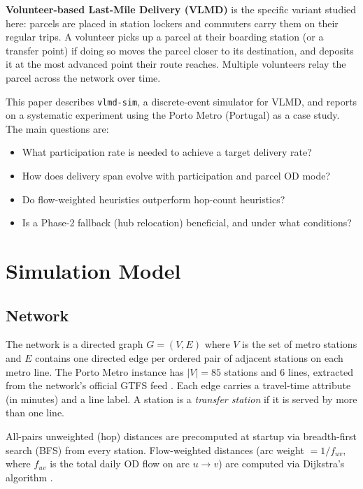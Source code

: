 \documentclass[11pt,a4paper]{article}
\begin{document}
\textbf{Volunteer-based Last-Mile Delivery (VLMD)} is the specific variant
studied here: parcels are placed in station lockers and commuters carry them
on their regular trips. A volunteer picks up a parcel at their boarding
station (or a transfer point) if doing so moves the parcel closer to its
destination, and deposits it at the most advanced point their route reaches.
Multiple volunteers relay the parcel across the network over time.

This paper describes \texttt{vlmd-sim}, a discrete-event simulator for VLMD,
and reports on a systematic experiment using the Porto Metro (Portugal) as a
case study. The main questions are:

\begin{itemize}
  \item What participation rate is needed to achieve a target delivery rate?
  \item How does delivery span evolve with participation and parcel OD mode?
  \item Do flow-weighted heuristics outperform hop-count heuristics?
  \item Is a Phase-2 fallback (hub relocation) beneficial, and under what
        conditions?
\end{itemize}

\section{Simulation Model}

\subsection{Network}

The network is a directed graph $G=(V,E)$ where $V$ is the set of metro
stations and $E$ contains one directed edge per ordered pair of adjacent
stations on each metro line. The Porto Metro instance has $|V|=85$ stations
and 6 lines, extracted from the network's official GTFS feed
\cite{gtfs2006,metrodoporto2025}. Each edge carries a travel-time attribute
(in minutes) and a line label. A station is a \emph{transfer station} if it
is served by more than one line.

All-pairs unweighted (hop) distances are precomputed at startup via
breadth-first search (BFS) from every station. Flow-weighted distances
(arc weight $= 1/f_{uv}$, where $f_{uv}$ is the total daily OD flow on arc
$u\to v$) are computed via Dijkstra's algorithm \cite{dijkstra1959note}.
\end{document}
